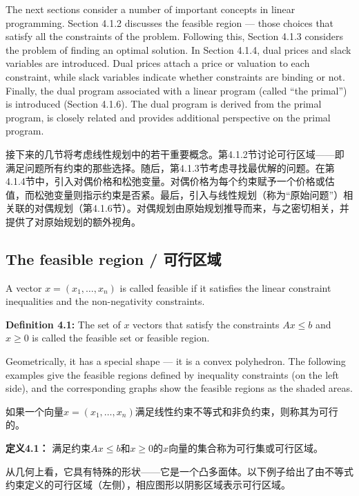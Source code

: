 \begin{original}
The next sections consider a number of important concepts in linear programming. Section 4.1.2 discusses the feasible region --- those choices that satisfy all the constraints of the problem. Following this, Section 4.1.3 considers the problem of finding an optimal solution. In Section 4.1.4, dual prices and slack variables are introduced. Dual prices attach a price or valuation to each constraint, while slack variables indicate whether constraints are binding or not. Finally, the dual program associated with a linear program (called ``the primal'') is introduced (Section 4.1.6). The dual program is derived from the primal program, is closely related and provides additional perspective on the primal program.
\end{original}
\begin{translation}
接下来的几节将考虑线性规划中的若干重要概念。第4.1.2节讨论可行区域——即满足问题所有约束的那些选择。随后，第4.1.3节考虑寻找最优解的问题。在第4.1.4节中，引入对偶价格和松弛变量。对偶价格为每个约束赋予一个价格或估值，而松弛变量则指示约束是否紧。最后，引入与线性规划（称为``原始问题''）相关联的对偶规划（第4.1.6节）。对偶规划由原始规划推导而来，与之密切相关，并提供了对原始规划的额外视角。
\end{translation}

\subsection{The feasible region / 可行区域}

\begin{original}
A vector $x = (x_1, \ldots, x_n)$ is called feasible if it satisfies the linear constraint inequalities and the non-negativity constraints.

\textbf{Definition 4.1:} The set of $x$ vectors that satisfy the constraints $Ax \le b$ and $x \ge 0$ is called the feasible set or feasible region.

Geometrically, it has a special shape --- it is a convex polyhedron. The following examples give the feasible regions defined by inequality constraints (on the left side), and the corresponding graphs show the feasible regions as the shaded areas.
\end{original}
\begin{translation}
如果一个向量$x = (x_1, \ldots, x_n)$满足线性约束不等式和非负约束，则称其为可行的。

\textbf{定义4.1：} 满足约束$Ax \le b$和$x \ge 0$的$x$向量的集合称为可行集或可行区域。

从几何上看，它具有特殊的形状——它是一个凸多面体。以下例子给出了由不等式约束定义的可行区域（左侧），相应图形以阴影区域表示可行区域。
\end{translation}


